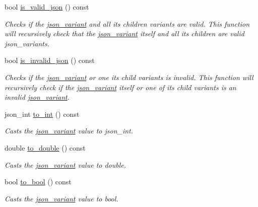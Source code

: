 \begin{DoxyCompactItemize}
bool \hyperlink{classJSONLIB__NAMESPACE_1_1json__variant_a158e3148d9256af3d1b8251b2ca7b6c4}{is\+\_\+valid\+\_\+json} () const
\begin{DoxyCompactList}\small\item\em Checks if the \hyperlink{classJSONLIB__NAMESPACE_1_1json__variant}{json\+\_\+variant} and all its children variants are valid. This function will recursively check that the \hyperlink{classJSONLIB__NAMESPACE_1_1json__variant}{json\+\_\+variant} itself and all its children are valid json\+\_\+variants. \end{DoxyCompactList}\item 
bool \hyperlink{classJSONLIB__NAMESPACE_1_1json__variant_a1a08b35da4cf3a334d32ebb81b20c08a}{is\+\_\+invalid\+\_\+json} () const
\begin{DoxyCompactList}\small\item\em Checks if the \hyperlink{classJSONLIB__NAMESPACE_1_1json__variant}{json\+\_\+variant} or one its child variants is invalid. This function will recursively check if the \hyperlink{classJSONLIB__NAMESPACE_1_1json__variant}{json\+\_\+variant} itself or one of its child variants is an invalid \hyperlink{classJSONLIB__NAMESPACE_1_1json__variant}{json\+\_\+variant}. \end{DoxyCompactList}\item 
json\+\_\+int \hyperlink{classJSONLIB__NAMESPACE_1_1json__variant_a8f30debf624e1a9d6cdc8aed8f7bda3d}{to\+\_\+int} () const
\begin{DoxyCompactList}\small\item\em Casts the \hyperlink{classJSONLIB__NAMESPACE_1_1json__variant}{json\+\_\+variant} value to {\itshape json\+\_\+int}. \end{DoxyCompactList}\item 
double \hyperlink{classJSONLIB__NAMESPACE_1_1json__variant_a9a5c7a9568e052b4a38d1b6107038d7b}{to\+\_\+double} () const
\begin{DoxyCompactList}\small\item\em Casts the \hyperlink{classJSONLIB__NAMESPACE_1_1json__variant}{json\+\_\+variant} value to {\itshape double}. \end{DoxyCompactList}\item 
bool \hyperlink{classJSONLIB__NAMESPACE_1_1json__variant_a7a675f60b84c0f8e6ee30aba7cb0b72c}{to\+\_\+bool} () const
\begin{DoxyCompactList}\small\item\em Casts the \hyperlink{classJSONLIB__NAMESPACE_1_1json__variant}{json\+\_\+variant} value to {\itshape bool}. \end{DoxyCompactList}\item 

\end{DoxyCompactItemize}

